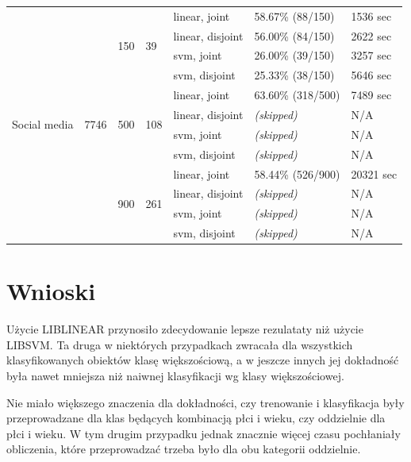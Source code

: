 \documentclass{article}
\begin{document}
\begin{adjustwidth}{-3.5cm}{-0cm}
\begin{tabular}{|p{2cm}|p{2cm}|p{2cm}|p{2cm}|p{3cm}|p{3cm}|p{3cm}|}
\multirow{12}{*}{Social media} & \multirow{12}{*}{7746} & \multirow{4}{*}{150} & \multirow{4}{*}{39} & 
linear, joint & 58.67\% (88/150) & 1536  sec \\  \cline{5-7}
& & & & 
linear, disjoint & 56.00\% (84/150) & 2622 sec \\  \cline{5-7}
& & & & 
svm, joint & 26.00\% (39/150) & 3257 sec \\  \cline{5-7}
& & & & 
svm, disjoint & 25.33\% (38/150) & 5646 sec \\  \cline{3-7}

& & \multirow{4}{*}{500} & \multirow{4}{*}{108} & 
linear, joint & 63.60\% (318/500) & 7489 sec \\  \cline{5-7}
& & & & 
linear, disjoint & \textit{(skipped)} & N/A \\  \cline{5-7}
& & & & 
svm, joint & \textit{(skipped)} & N/A \\  \cline{5-7}
& & & & 
svm, disjoint & \textit{(skipped)} & N/A \\  \cline{3-7}

& & \multirow{4}{*}{900} & \multirow{4}{*}{261} & 
linear, joint & 58.44\% (526/900) & 20321 sec \\  \cline{5-7}
& & & & 
linear, disjoint & \textit{(skipped)} & N/A \\  \cline{5-7}
& & & & 
svm, joint & \textit{(skipped)} & N/A \\  \cline{5-7}
& & & & 
svm, disjoint & \textit{(skipped)} & N/A \\  \hline


\end{tabular}

\end{adjustwidth}



\section{Wnioski}

Użycie LIBLINEAR przynosiło zdecydowanie lepsze rezulataty niż użycie LIBSVM. Ta druga w niektórych przypadkach zwracała dla wszystkich klasyfikowanych obiektów klasę większościową, a w jeszcze innych jej dokładność była nawet mniejsza niż naiwnej klasyfikacji wg klasy większościowej.

Nie miało większego znaczenia dla dokładności, czy trenowanie i klasyfikacja były przeprowadzane dla klas będących kombinacją płci i wieku, czy oddzielnie dla płci i wieku. W tym drugim przypadku jednak znacznie więcej czasu pochłaniały obliczenia, które przeprowadzać trzeba było dla obu kategorii oddzielnie.
\end{document}
